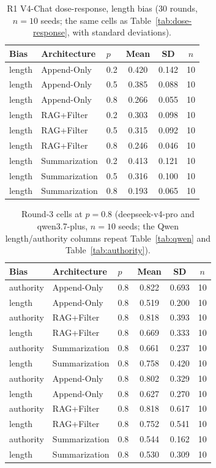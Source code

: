 \documentclass[11pt]{article}
\begin{document}
\begin{table}[htbp]
\centering
\caption{R1 V4-Chat dose-response, length bias (30 rounds, $n{=}10$ seeds; the same cells as Table~\ref{tab:dose-response}, with standard deviations).}
\label{tab:supp-full-r1}
\small
\begin{tabular}{lllccc}
\toprule
Bias & Architecture & $p$ & Mean & SD & $n$ \\
\midrule
length & Append-Only & 0.2 & 0.420 & 0.142 & 10 \\
length & Append-Only & 0.5 & 0.385 & 0.088 & 10 \\
length & Append-Only & 0.8 & 0.266 & 0.055 & 10 \\
length & RAG+Filter & 0.2 & 0.303 & 0.098 & 10 \\
length & RAG+Filter & 0.5 & 0.315 & 0.092 & 10 \\
length & RAG+Filter & 0.8 & 0.246 & 0.046 & 10 \\
length & Summarization & 0.2 & 0.413 & 0.121 & 10 \\
length & Summarization & 0.5 & 0.316 & 0.100 & 10 \\
length & Summarization & 0.8 & 0.193 & 0.065 & 10 \\
\bottomrule
\end{tabular}
\end{table}

\begin{table}[htbp]
\centering
\caption{Round-3 cells at $p{=}0.8$ (deepseek-v4-pro and qwen3.7-plus, $n{=}10$ seeds; the Qwen length/authority columns repeat Table~\ref{tab:qwen} and Table~\ref{tab:authority}).}
\label{tab:supp-full-round3}
\small
\begin{tabular}{lllccc}
\toprule
Bias & Architecture & $p$ & Mean & SD & $n$ \\
\midrule
authority & Append-Only & 0.8 & 0.822 & 0.693 & 10 \\
length & Append-Only & 0.8 & 0.519 & 0.200 & 10 \\
authority & RAG+Filter & 0.8 & 0.818 & 0.393 & 10 \\
length & RAG+Filter & 0.8 & 0.669 & 0.333 & 10 \\
authority & Summarization & 0.8 & 0.661 & 0.237 & 10 \\
length & Summarization & 0.8 & 0.758 & 0.420 & 10 \\
authority & Append-Only & 0.8 & 0.802 & 0.329 & 10 \\
length & Append-Only & 0.8 & 0.627 & 0.270 & 10 \\
authority & RAG+Filter & 0.8 & 0.818 & 0.617 & 10 \\
length & RAG+Filter & 0.8 & 0.752 & 0.541 & 10 \\
authority & Summarization & 0.8 & 0.544 & 0.162 & 10 \\
length & Summarization & 0.8 & 0.530 & 0.309 & 10 \\
\bottomrule
\end{tabular}
\end{table}
\end{document}

